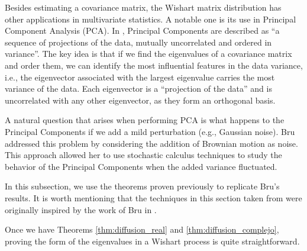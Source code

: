 Besides estimating a covariance matrix, the Wishart matrix distribution has other applications in multivariate statistics. A notable one is its use in Principal Component Analysis (PCA). In \cite{book:hastie_tibshirani}, Principal Components are described as ``a sequence of projections of the data, mutually uncorrelated and ordered in variance''. The key idea is that if we find the eigenvalues of a covariance matrix and order them, we can identify the most influential features in the data variance, i.e., the eigenvector associated with the largest eigenvalue carries the most variance of the data. Each eigenvector is a “projection of the data” and is uncorrelated with any other eigenvector, as they form an orthogonal basis.


A natural question that arises when performing PCA is what happens to the Principal Components if we add a mild perturbation (e.g., Gaussian noise). Bru \cite{bru1989diffusions} addressed this problem by considering the addition of Brownian motion as noise. This approach allowed her to use stochastic calculus techniques to study the behavior of the Principal Components when the added variance fluctuated.

In this subsection, we use the theorems proven previously to replicate Bru's results. It is worth mentioning that the techniques in this section taken from \cite{article:multiyamada} were originally inspired by the work of Bru in \cite{bru1989diffusions}.


Once we have Theorems \ref{thm:diffusion_real} and \ref{thm:diffusion_complejo}, proving the form of the eigenvalues in a Wishart process is quite straightforward.



